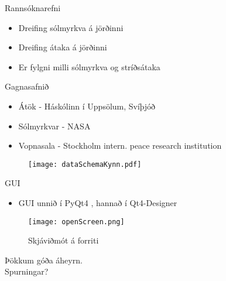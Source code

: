 \documentclass{rubeamer}
\begin{document}
\rutitleframe{}


\begin{frame}{Rannsóknarefni}
	\begin{itemize}
		\item Dreifing sólmyrkva á jörðinni
		\item Dreifing átaka á jörðinni
		\item Er fylgni milli sólmyrkva og stríðsátaka
		
	\end{itemize}
\end{frame}

\begin{frame}{Gagnasafnið}
	\vspace{2em}
	\begin{itemize}
		\item Átök - Háskólinn í Uppsölum, Svíþjóð \cite{conflict}
		\item Sólmyrkvar - NASA \cite{Eclipse}
		\item Vopnasala - Stockholm intern. peace research institution \cite{weapon}
	\end{itemize}
	
	\begin{figure}
		\centering
		\texttt{[image: dataSchemaKynn.pdf]}
	\end{figure}
\end{frame}

\begin{frame}{GUI}
	\begin{itemize}
		\item GUI unnið í PyQt4 \cite{qt4}, hannað í Qt4-Designer
	\end{itemize}
	\begin{figure}
		\centering
		\texttt{[image: openScreen.png]}
		\caption*{Skjáviðmót á forriti}
	\end{figure}
\end{frame}

	
\begin{frame}
	\centering
	Þökkum góða áheyrn. \\
	Spurningar?\\
\end{frame}

\bibframe
\end{document}
